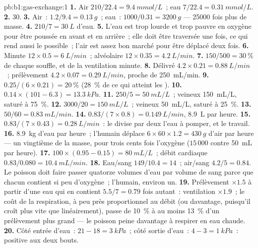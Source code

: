 \begin{solution}{pb:b1:gas-exchange:1}
\textbf{1.} Air $210/22.4 = \qty{9.4}{mmol/L}$~; eau $7/22.4 =
\qty{0.31}{mmol/L}$.
\textbf{2.} 30.
\textbf{3.} Air~: $1.2/9.4 = \qty{0.13}{g}$~; eau~: $1000/0.31 =
\qty{3200}{g}$ --- \num{25000} fois plus de masse.
\textbf{4.} $210/7 = \qty{30}{L}$ d'eau.
\textbf{5.} L'eau est trop lourde et trop pauvre en oxygène pour être
poussée en avant et en arrière~; elle doit être traversée une fois, ce
qui rend aussi le  possible~; l'air est assez bon marché
pour être déplacé deux fois.
\textbf{6.} Minute $12\times 0.5 = \qty{6}{L/min}$~; alvéolaire
$12\times 0.35 = \qty{4.2}{L/min}$.
\textbf{7.} $150/500 = \qty{30}{\%}$ de chaque souffle, et de la ventilation minute.
\textbf{8.} Délivré $4.2\times 0.21 = \qty{0.88}{L/min}$~; prélèvement
$4.2\times 0.07 = \qty{0.29}{L/min}$, proche de \qty{250}{mL/min}.
\textbf{9.} $0.25/(6\times 0.21) = \qty{20}{\%}$ (\qty{28}{\%} de ce
qui atteint les ).
\textbf{10.} $0.14\times(101 - 6.3) = \qty{13.3}{kPa}$.
\textbf{11.} $250/5 = \qty{50}{mL/L}$~; veineux \qty{150}{mL/L},
saturé à \qty{75}{\%}.
\textbf{12.} $3000/20 = \qty{150}{mL/L}$~; veineux \qty{50}{mL/L},
saturé à \qty{25}{\%}.
\textbf{13.} $50/60 = \qty{0.83}{mL/min}$.
\textbf{14.} $0.83/(7\times 0.8) = \qty{0.149}{L/min}$, \qty{8.9}{L}
par heure.
\textbf{15.} $0.83/(7\times 0.43) = \qty{0.28}{L/min}$~: le
 divise par deux l'eau à pomper, et le travail.
\textbf{16.} \qty{8.9}{kg} d'eau par heure~; l'humain déplace $6\times
60\times 1.2 = \qty{430}{g}$ d'air par heure --- un vingtième de la
masse, pour trois cents fois l'oxygène ($15\,000$ contre
\qty{50}{mL} par heure).
\textbf{17.} $100\times(0.95 - 0.15) = \qty{80}{mL/L}$~; débit cardiaque
$0.83/0.080 = \qty{10.4}{mL/min}$.
\textbf{18.} Eau/sang $149/10.4 = 14$~; air/sang $4.2/5 = 0.84$.
Le poisson doit faire passer quatorze volumes d'eau par volume de sang
parce que chacun contient si peu d'oxygène~; l'humain, environ un.
\textbf{19.} Prélèvement $\times 1.5$ à partir d'une eau qui en
contient $5.5/7 = 0.79$ fois autant~: ventilation
$\times 1.9$~; le coût de la respiration, à peu près proportionnel au
débit (ou davantage, puisqu'il croît plus vite que linéairement), passe
de \qty{10}{\%} à au moins \qty{13}{\%} d'un prélèvement plus grand ---
le poisson peine davantage à respirer en eau chaude.
\textbf{20.} Côté entrée d'eau~: $21 - 18 = \qty{3}{kPa}$~; côté sortie
d'eau~: $4 - 3 = \qty{1}{kPa}$~: positive aux deux bouts.

\end{solution}
